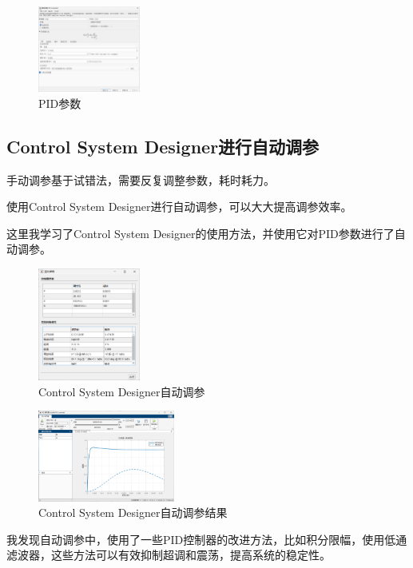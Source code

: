 \documentclass[12pt,a4paper,UTF8]{article}
\begin{document}
\begin{figure}[htbp] \centering \includegraphics[width=0.3\textwidth]{2024-12-30-11-52-12.png} \caption{PID参数}\end{figure}

\subsection{Control System Designer进行自动调参}

手动调参基于试错法，需要反复调整参数，耗时耗力。

使用Control System Designer进行自动调参，可以大大提高调参效率。

这里我学习了Control System Designer的使用方法，并使用它对PID参数进行了自动调参。

\begin{figure}[htbp] \centering \includegraphics[width=0.3\textwidth]{2024-12-30-11-56-41.png} \caption{Control System Designer自动调参}\end{figure}

\begin{figure}[htbp] \centering \includegraphics[width=0.4\textwidth]{2024-12-30-11-56-53.png} \caption{Control System Designer自动调参结果}\end{figure}

我发现自动调参中，使用了一些PID控制器的改进方法，比如积分限幅，使用低通滤波器，这些方法可以有效抑制超调和震荡，提高系统的稳定性。
\end{document}
